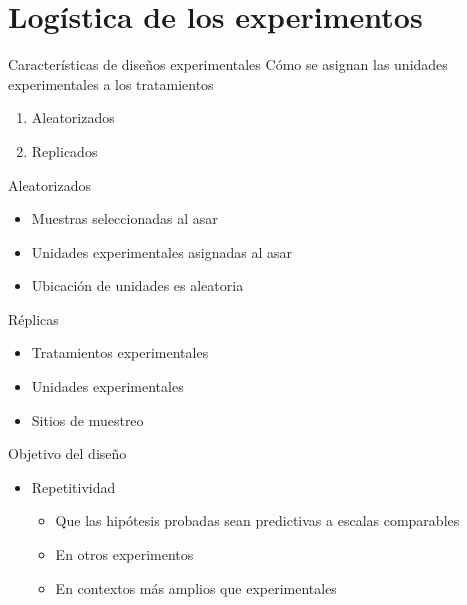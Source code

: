 \documentclass[
  11pt,
  ignorenonframetext,
]{beamer}
\begin{document}
\hypertarget{loguxedstica-de-los-experimentos}{%
\section{Logística de los
experimentos}\label{loguxedstica-de-los-experimentos}}

\begin{frame}{Características de diseños experimentales}
\protect\hypertarget{caracteruxedsticas-de-diseuxf1os-experimentales}{}
Cómo se asignan las unidades experimentales a los tratamientos

\begin{enumerate}
\item
  Aleatorizados
\item
  Replicados
\end{enumerate}
\end{frame}

\begin{frame}{Aleatorizados}
\protect\hypertarget{aleatorizados}{}
\begin{itemize}
\item
  Muestras seleccionadas al asar
\item
  Unidades experimentales asignadas al asar
\item
  Ubicación de unidades es aleatoria
\end{itemize}
\end{frame}

\begin{frame}{Réplicas}
\protect\hypertarget{ruxe9plicas}{}
\begin{itemize}
\item
  Tratamientos experimentales
\item
  Unidades experimentales
\item
  Sitios de muestreo
\end{itemize}
\end{frame}

\begin{frame}{Objetivo del diseño}
\protect\hypertarget{objetivo-del-diseuxf1o}{}
\begin{itemize}
\item
  Repetitividad

  \begin{itemize}
  \item
    Que las hipótesis probadas sean predictivas a escalas comparables
  \item
    En otros experimentos
  \item
    En contextos más amplios que experimentales
  \end{itemize}
\end{itemize}
\end{frame}
\end{document}
